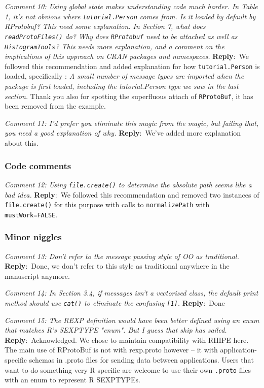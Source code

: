 \documentclass[10pt]{article}
\newcommand{\pointRaised}[2]{\smallskip %
  \textsl{{\fontseries{b}\selectfont #1}: #2}\newline}
\newcommand{\reply}[1]{\textbf{Reply}:\ #1 \smallskip } %
\begin{document}
\pointRaised{Comment 10}{Using global state makes understanding code much harder. In Table 1,
  it's not obvious where \texttt{tutorial.Person} comes from. Is it loaded by
  default by RProtobuf? This need some explanation. In Section 7, what
  does \texttt{readProtoFiles()} do? Why does \texttt{RProtobuf} need to be attached
  as well as \texttt{HistogramTools}? This needs more explanation, and a
  comment on the implications of this approach on CRAN packages and
  namespaces.}
\reply{We followed this recommendation and added explanation for how
\texttt{tutorial.Person} is loaded, specifically : \emph{A small number of message types are imported when the
package is first loaded, including the tutorial.Person type we saw in
the last section.}  Thank you also for spotting the superfluous attach
of \texttt{RProtoBuf}, it has been removed from the example.}

\pointRaised{Comment 11}{
  I'd prefer you eliminate this magic from the magic, but failing that,
  you need a good explanation of why.}
\reply{We've added more explanation about this.}

\subsubsection*{Code comments}

\pointRaised{Comment 12}{Using \texttt{file.create()} to determine the absolute path seems like a bad idea.}
\reply{We followed this recommendation and removed two instances of
  \texttt{file.create()} for this purpose with calls to
  \texttt{normalizePath} with \texttt{mustWork=FALSE}.}

\subsubsection*{Minor niggles}

\pointRaised{Comment 13}{Don't refer to the message passing style of OO as traditional.}
\reply{Done, we don't refer to this style as traditional anywhere in
  the manuscript anymore.}

\pointRaised{Comment 14}{In Section 3.4, if messages isn't a vectorised class, the default
   print method should use \texttt{cat()} to eliminate the confusing \texttt{[1]}.}
\reply{Done}

\pointRaised{Comment 15}{The REXP definition would have been better defined using an enum that
   matches R's SEXPTYPE "enum". But I guess that ship has sailed.}
\reply{Acknowledged.  We chose to maintain compatibility with RHIPE here.  The main
use of RProtoBuf is not with rexp.proto however -- it with
application-specific schemas in .proto files for sending data between
applications.  Users that want to do something very R-specific are
welcome to use their own \texttt{.proto} files with an enum to represent R SEXPTYPEs.}
\end{document}
